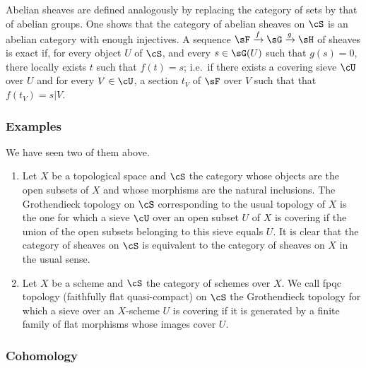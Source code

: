 Abelian sheaves are defined analogously by 
replacing the category of sets by that of abelian groups. One 
shows that the category of abelian sheaves on $\cS$ is an 
abelian category with enough injectives. A sequence 
$\sF\xrightarrow f \sG\xrightarrow g \sH$ of sheaves is exact if, for 
every object $U$ of $\cS$, and every $s\in \sG(U)$ such that $g(s)=0$, 
there locally exists $t$ such that $f(t)=s$; i.e.\ if there exists a covering sieve 
$\cU$ over $U$ and for every $V\in\cU$, a section $t_V$ of $\sF$ over $V$ such that 
that $f(t_V)=s|V$. 





\subsubsection{Examples}\label{I:1-6-4}

We have seen two of them above. 

\begin{enumerate}[\indent a)]
  \item Let $X$ be a topological space and $\cS$ the category whose objects 
    are the open subsets of $X$ and whose morphisms are the natural inclusions. The 
    Grothendieck topology on $\cS$ corresponding to the usual topology 
    of $X$ is the one for which a sieve $\cU$ over an open subset $U$ of $X$ is 
    covering if the union of the open subsets belonging to this sieve equals 
    $U$. It is clear that the category of sheaves on $\cS$ is equivalent 
    to the category of sheaves on $X$ in the usual sense. 
  \item Let $X$ be a scheme and $\cS$ the category of schemes over $X$. We 
    call fpqc topology (faithfully flat quasi-compact) on $\cS$ the 
    Grothendieck topology for which a sieve over an $X$-scheme $U$ is 
    covering if it is generated by a finite family of flat morphisms whose  
    images cover $U$. 
\end{enumerate}





\subsubsection{Cohomology}\label{I:1-6-5}

